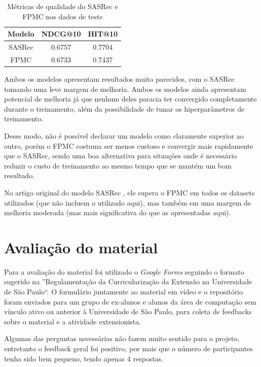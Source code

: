
\begin{table}[H]
    \centering
    \begin{tabular}{|c|c|c|}
        \hline
        Modelo & NDCG@10 & HIT@10 \\ \hline
        SASRec & 0.6757 & 0.7704 \\ \hline
        FPMC & 0.6733 & 0.7437 \\ \hline
    \end{tabular}
    \caption{Métricas de qualidade do SASRec e FPMC nos dados de teste}
    \label{tab:results}
\end{table}

Ambos os modelos apresentam resultados muito parecidos, com o SASRec tomando uma
leve margem de melhoria. Ambos os modelos ainda apresentam potencial de melhoria
já que nenhum deles paracia ter convergido completamente durante o treinamento,
além da possibilidade de tunar os hiperparâmetros de treinamento.

Desse modo, não é possível declarar um modelo como claramente superior ao outro,
porém o FPMC costuma ser menos custoso e convergir mais rapidamente que o SASRec,
sendo uma boa alternativa para situações onde é necessário reduzir o custo de
treinamento ao mesmo tempo que se mantém um bom resultado.

No artigo original do modelo SASRec \cite{sasrec}, ele supera o FPMC em
todos os datasets utilizados (que não incluem o utilizado aqui), mas também em
uma margem de melhoria moderada (mas mais significativa do que as apresentadas
aqui).

\section*{Avaliação do material}

Para a avaliação do material foi utilizado o \textit{Google Forms} seguindo
o formato sugerido na ''Regulamentação da Curricularização da Extensão na
Universidade de São Paulo``. O formulário juntamente ao material em vídeo e o
repositório foram enviados para um grupo de ex-alunos e alunos da área de 
computação sem vínculo ativo ou anterior à Universidade de São Paulo, para 
coleta de feedbacks sobre o material e a atividade extensionista.

Algumas das perguntas necessárias não fazem muito sentido para o projeto,
entretanto o feedback geral foi positivo, por mais que o número de participantes
tenha sido bem pequeno, tendo apenas 4 respostas.


